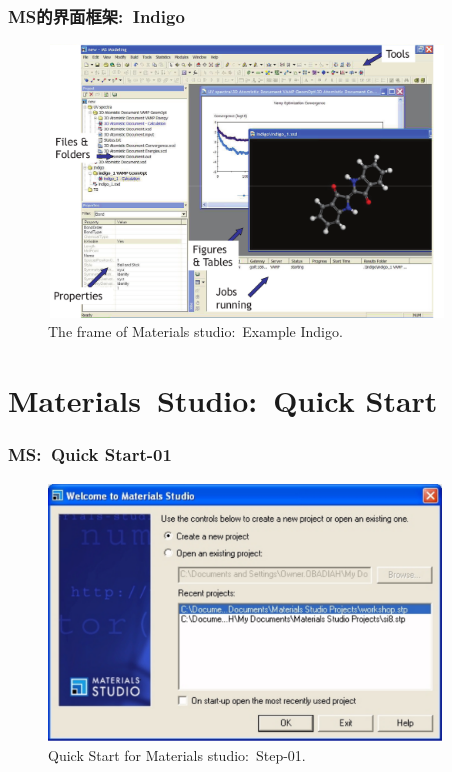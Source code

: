 {
	\frametitle{\textrm{MS}的界面框架:~\textrm{Indigo}}
\begin{figure}[h!]
\centering
\vspace*{-0.28in}
\includegraphics[height=2.85in,width=4.15in,viewport=0 0 1140 800,clip]{Figures/MS-Frame_example.png}
\caption{\tiny \textrm{The frame of Materials studio:~Example Indigo.}}%
\label{MS-Frame_example}
\end{figure}
}

\section{\rm{Materials~Studio:~Quick Start}}
\frame
{
	\frametitle{\textrm{MS:~Quick Start-01}}
\begin{figure}[h!]
\centering
\vspace*{-0.21in}
\includegraphics[height=2.70in,width=4.10in,viewport=0 0 1134 740,clip]{Figures/MS-New_Project-01.png}
\caption{\tiny \textrm{Quick Start for Materials studio:~Step-01.}}%
\label{MS-Quick_Start-01}
\end{figure}
}

